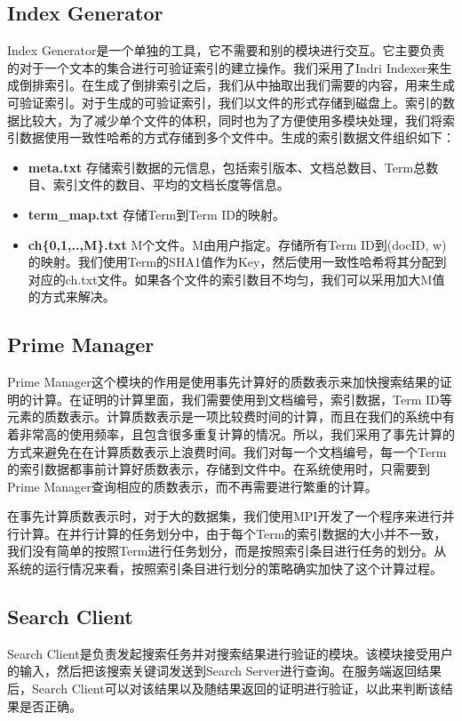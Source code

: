 \subsection{Index Generator}
Index Generator是一个单独的工具，它不需要和别的模块进行交互。它主要负责的对于一个文本的集合进行可验证索引的建立操作。我们采用了Indri Indexer来生成倒排索引。在生成了倒排索引之后，我们从中抽取出我们需要的内容，用来生成可验证索引。对于生成的可验证索引，我们以文件的形式存储到磁盘上。索引的数据比较大，为了减少单个文件的体积，同时也为了方便使用多模块处理，我们将索引数据使用一致性哈希的方式存储到多个文件中。生成的索引数据文件组织如下：
\begin{itemize}
\item \textbf{meta.txt} 存储索引数据的元信息，包括索引版本、文档总数目、Term总数目、索引文件的数目、平均的文档长度等信息。
\item \textbf{term\_map.txt} 存储Term到Term ID的映射。
\item \textbf{ch\{0,1,..,M\}.txt} M个文件。M由用户指定。存储所有Term ID到(docID, w)的映射。我们使用Term的SHA1值作为Key，然后使用一致性哈希将其分配到对应的ch.txt文件。如果各个文件的索引数目不均匀，我们可以采用加大M值的方式来解决。
\end{itemize}

\subsection{Prime Manager}
Prime Manager这个模块的作用是使用事先计算好的质数表示来加快搜索结果的证明的计算。在证明的计算里面，我们需要使用到文档编号，索引数据，Term ID等元素的质数表示。计算质数表示是一项比较费时间的计算，而且在我们的系统中有着非常高的使用频率，且包含很多重复计算的情况。所以，我们采用了事先计算的方式来避免在在计算质数表示上浪费时间。我们对每一个文档编号，每一个Term的索引数据都事前计算好质数表示，存储到文件中。在系统使用时，只需要到Prime Manager查询相应的质数表示，而不再需要进行繁重的计算。

在事先计算质数表示时，对于大的数据集，我们使用MPI开发了一个程序来进行并行计算。在并行计算的任务划分中，由于每个Term的索引数据的大小并不一致，我们没有简单的按照Term进行任务划分，而是按照索引条目进行任务的划分。从系统的运行情况来看，按照索引条目进行划分的策略确实加快了这个计算过程。

\subsection{Search Client}
Search Client是负责发起搜索任务并对搜索结果进行验证的模块。该模块接受用户的输入，然后把该搜索关键词发送到Search Server进行查询。在服务端返回结果后，Search Client可以对该结果以及随结果返回的证明进行验证，以此来判断该结果是否正确。

